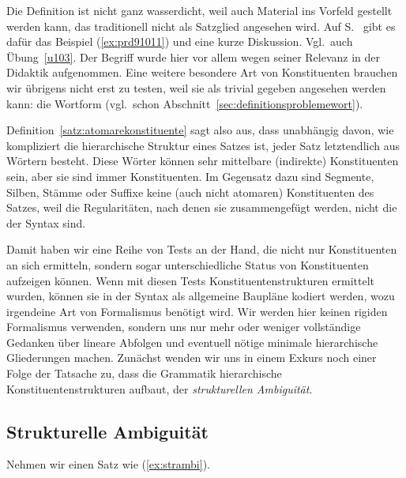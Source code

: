 Die Definition ist nicht ganz wasserdicht, weil auch Material ins Vorfeld gestellt werden kann, das traditionell nicht als Satzglied angesehen wird.
Auf S.~\pageref{abs:satzgliedfail} gibt es dafür das Beispiel (\ref{ex:prd91011}) und eine kurze Diskussion.
Vgl.\ auch Übung~\ref{u103}.
Der Begriff wurde hier vor allem wegen seiner Relevanz in der Didaktik aufgenommen.
Eine weitere besondere Art von Konstituenten brauchen wir übrigens nicht erst zu testen, weil sie als trivial gegeben angesehen werden kann: die Wortform (vgl.\ schon Abschnitt~\ref{sec:definitionsproblemewort}).


Definition~\ref{satz:atomarekonstituente} sagt also aus, dass unabhängig davon, wie kompliziert die hierarchische Struktur eines Satzes ist, jeder Satz letztendlich aus Wörtern besteht.
Diese Wörter können sehr mittelbare (indirekte) Konstituenten sein, aber sie sind immer Konstituenten.
Im Gegensatz dazu sind Segmente, Silben, Stämme oder Suffixe keine (auch nicht atomaren) Konstituenten des Satzes, weil die Regularitäten, nach denen sie zusammengefügt werden, nicht die der Syntax sind.

Damit haben wir eine Reihe von Tests an der Hand, die nicht nur Konstituenten an sich ermitteln, sondern sogar unterschiedliche Status von Konstituenten aufzeigen können.
Wenn mit diesen Tests Konstituentenstrukturen ermittelt wurden, können sie in der Syntax als allgemeine Baupläne kodiert werden, wozu irgendeine Art von Formalismus benötigt wird.
Wir werden hier keinen rigiden Formalismus verwenden, sondern uns nur mehr oder weniger vollständige Gedanken über lineare Abfolgen und eventuell nötige minimale hierarchische Gliederungen machen.
Zunächst wenden wir uns in einem Exkurs noch einer Folge der Tatsache zu, dass die Grammatik hierarchische Konstituentenstrukturen aufbaut, der \textit{strukturellen Ambiguität}.

\subsection{Strukturelle Ambiguität}

Nehmen wir einen Satz wie (\ref{ex:strambi}).

\begin{exe}
\end{exe}

